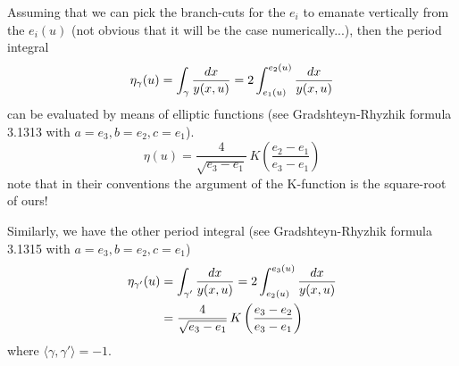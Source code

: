 \documentclass[11pt]{article}
\newcommand{\be}{\begin{equation}}
\newcommand{\ee}{\end{equation}}
\begin{document}
Assuming that we can pick the branch-cuts for the $e_{i}$ to emanate vertically from the $e_{i}(u)$ (not obvious that it will be the case numerically...), then the period integral
\be
	\eta_{\gamma}(u) = \int_{\gamma} {dx\over y(x,u)} = 2 \int_{e_{1}(u)}^{e_{2}(u)}{dx\over y(x,u)}
\ee
can be evaluated by means of elliptic functions (see Gradshteyn-Rhyzhik formula 3.1313 with $a=e_{3}, b=e_{2}, c=e_{1}$).
\be
	\eta(u) = \frac{4}{\sqrt{e_{3}-e_{1}}} \, K\left( \frac{e_{2}-e_{1}}{e_{3}-e_{1}} \right)
\ee
note that in their conventions the argument of the K-function is the square-root of ours!

Similarly, we have the other period integral (see Gradshteyn-Rhyzhik formula 3.1315 with $a=e_{3}, b=e_{2}, c=e_{1}$)
\be
\begin{split}
	\eta_{\gamma'}(u) &= \int_{\gamma'} {dx\over y(x,u)} = 2 \int_{e_{2}(u)}^{e_{3}(u)}{dx\over y(x,u)} \\
	&= \frac{4}{\sqrt{e_{3}-e_{1}}} \, K\left( \frac{e_{3}-e_{2}}{e_{3}-e_{1}} \right)
\end{split}
\ee
where $\langle\gamma,\gamma'\rangle = -1$.
\end{document}
